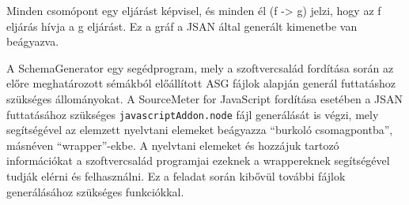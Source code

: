 Minden csomópont egy eljárást képvisel, és minden él (f -> g) jelzi, hogy az f eljárás hívja a g eljárást. Ez a gráf a JSAN által generált kimenetbe van beágyazva.

A SchemaGenerator egy segédprogram, mely a szoftvercsalád fordítása során az előre meghatározott sémákból előállított ASG fájlok alapján generál futtatáshoz szükséges állományokat. A SourceMeter for JavaScript fordítása esetében a JSAN futtatásához szükséges \texttt{javascriptAddon.node} fájl generálását is végzi, mely segítségével az elemzett nyelvtani elemeket beágyazza ``burkoló csomagpontba'', másnéven ``wrapper''-ekbe. A nyelvtani elemeket és hozzájuk tartozó információkat a szoftvercsalád programjai ezeknek a wrappereknek segítségével tudják elérni és felhasználni. Ez a feladat során kibővül további fájlok generálásához szükséges funkciókkal.


